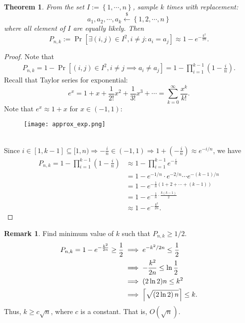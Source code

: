 \documentclass[12pt,openany]{book}
\DeclarePairedDelimiter{\ceil}{\lceil}{\rceil}
\newtheorem{theorem}{Theorem}
\theoremstyle{definition}
\newtheorem{remark}{Remark}[chapter]
\newcommand{\set}[1]{\left\{#1\right\}}
\newcommand{\of}[1]{\left( #1 \right)}
\newcommand{\dollar}{\$}
\newcommand{\uniform}{\xleftarrow{\dollar}}
\begin{document}
	\newpage
	\begin{tcolorbox}[colback=white,colframe=thmcolor,arc=5pt,title={\color{white}\bf Birthday Bound}]
		\begin{theorem}
			From the set $I:=\set{1,\cdots,n}$, sample $k$ times with replacement: \[
			a_1,a_2,\cdots,a_k\uniform\set{1,2,\cdots,n}
			\] where all element of $I$ are equally likely. Then \[
			P_{n,k}:=\Pr\left[\exists \of{i,j}\in I^2, i\neq j:a_i=a_j\right]\approx 1-e^{-\frac{k^2}{2n}}.
			\]
		\end{theorem}
	\end{tcolorbox}
	\begin{proof}
		Note that \begin{align*}
			P_{n,k}=1-\Pr[(i,j)\in I^2, i\neq j\implies a_i\neq a_j]=1-\prod_{i=1}^{k-1}\of{1-\frac{i}{n}}.
		\end{align*} Recall that Taylor series for exponential: \[
		e^x=1+x+\frac{1}{2!}x^2+\frac{1}{3!}x^3+\cdots=\sum_{k=0}^{\infty}\frac{x^k}{k!}.
		\] Note that $e^x\approx1+x$ for $x\in(-1,1)$:
		\begin{figure}[ht!]
			\centering
			\texttt{[image: approx\_exp.png]}
		\end{figure}\\
		Since $i\in[1,k-1]\subseteq[1,n)\Rightarrow-\frac{i}{n}\in\of{-1,1}\Rightarrow 1+\of{-\frac{i}{n}}\approx e^{-i/n}$, we have \begin{align*}
			P_{n,k}=
			1-\prod_{i=1}^{k-1}\of{1-\frac{i}{n}}
			&\approx 1-\prod_{i=1}^{k-1}e^{-\frac{i}{n}}\\
			&=1-e^{-1/n}\cdot e^{-2/n}\cdots e^{-(k-1)/n}\\
			&=1-e^{-\frac{1}{n}\of{1+2+\cdots+(k-1)}}\\
			&=1-e^{-\frac{1}{n}\cdot\frac{k\of{k-1}}{2}}\\
			&\approx 1-e^{-\frac{k^2}{2n}}.
		\end{align*}
	\end{proof}

	\begin{remark}
		Find minimum value of $k$ such that $P_{n,k}\geq 1/2$. \begin{align*}
		P_{n,k}=1-e^{-\frac{k^2}{2n}}\geq\frac{1}{2}&\implies e^{-k^2/2n}\leq\frac{1}{2}\\
		&\implies-\frac{k^2}{2n}\leq\ln\frac{1}{2}\\
		&\implies (2\ln2)n\leq k^2\\
		&\implies \ceil*{\sqrt{\of{2\ln 2}n}}\leq k.
		\end{align*} 
		Thus, $k\geq c\sqrt{n}$, where $c$ is a constant. That is, $O(\sqrt{n})$.
	\end{remark}
\end{document}
